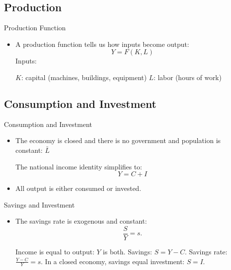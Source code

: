 \documentclass[10pt,aspectratio=169]{beamer}
\begin{document}
\subsection{Production}
\begin{frame}{Production Function}

\begin{itemize}
    \item A production function tells us how inputs become output:
    \[
        Y = F(K,L)
    \]
    \vspace{-.3cm}
    \itemvso Inputs:
        \begin{itemize}
            \itemvso $K$: capital (machines, buildings, equipment)
            \itemvso $L$: labor (hours of work)
        \end{itemize}

\end{itemize}

\end{frame}


\subsection{Consumption and Investment}
\begin{frame}{Consumption and Investment}
\begin{itemize}
\item The economy is closed and there is no government and population is constant: $\bar{L}$

    \itemvso The national income identity simplifies to:
    \[
        Y = C + I
    \]
    \vspace{-.3cm}
    \item All output is either consumed or invested.
\end{itemize}

\end{frame}

\begin{frame}{Savings and Investment}
\begin{itemize}
\item The savings rate is exogenous and constant:
\[
    \frac{S}{Y} = s.
\]

    \itemvso Income is equal to output: \(Y\) is both.
    \itemvso Savings: \(S = Y - C\).
    \itemvso Savings rate: \(\frac{Y-C}{Y} = s\).
    \itemvso In a closed economy, savings equal investment: \(S = I\).
\end{itemize}
\end{frame}
\end{document}
